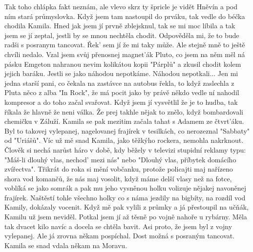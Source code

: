 
Tak toho chlápka fakt neznám, ale vlevo skrz ty špricle je vidět
Hněvín a pod ním stará průmyslovka. Když jsem tam nastoupil do prváku,
tak vedle do béčka chodila Kamila. Hned jak jsem jí prvně zblejsknul,
tak se mi moc líbila a tak jsem se jí zeptal, jestli by se mnou
nechtěla chodit. Odpověděla mi, že to bude radši s posranym tancovat.
Řek' sem jí že mi taky může. Ale stejně mně to ještě chvíli nedalo.
Vzal jsem svůj přenosnej magnet'ák Pluto, co jsem na něm měl ná pásku
Emgeton nahranou nevim kolikátou kopii "Párplů" a zkusil chodit kolem
jejich baráku. Jestli se jako náhodou nepotkáme. Náhodou
nepotkali... Jen mi jedna starší pani, co čekala na zastávce na autobus
řekla, to když zaslechla z Pluta něco z alba "In Rock", že má pocit
jako by právě někdo vedle ní nahodil kompresor a do toho začal
svařovat. Když jsem jí vysvětlil že je to hudba, tak říkala že hlavně
že neni válka. Že prej takhle nějak to znělo, když bombardovali
chemičku v Záluží. Kamila se pak mezitim začala tahat s Adamem ze
čtvrt'áku. Byl to takovej vylepanej, nagelovanej frajírek v tesilkách,
co nerozeznal "Sabbaty" od "Uriášů". Víc už mě snad Kamila, jako
těžkýho rockera, nemohla nakrknout. Člověk si nechá narůst háro v
době, kdy běžely v televizi stupidní reklamy typu: "Máš-li dlouhý
vlas, nechod' mezi nás" nebo "Dlouhý vlas, příbytek domácího
zvířectva". Třikrát do roka si mění vobčanku, protože policajti maj
nařízeno shora vod komančů, že nás maj vosolit, když máme delší vlasy
než na fotce, voblíká se jako somrák a pak mu jeho vysněnou holku
volizuje nějakej navoněnej frajírek. Naštěstí tohle všechno holky co s
náma jezdily na bigbíty, na rozdíl vod Kamily, dokázaly vocenit. Když
mě pak vylili z průmky a já přestoupil na učňák, Kamilu už jsem
neviděl. Potkal jsem jí až těsně po vojně nahoře u rybárny. Měla tak
dvacet kilo navíc a docela se chtěla bavit. Asi proto, že jsem byl z
vojny vylepanej. Ale já zrovna někam pospíchal. Dost možná s posraným
tancovat. Kamila se snad vdala někam na Moravu.

